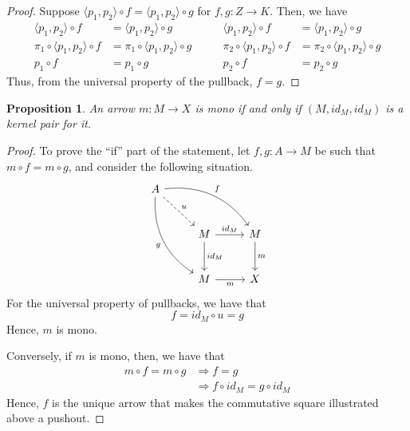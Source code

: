 \documentclass[runningheads,envcountsect]{llncs}
\theoremstyle{plain}
\newtheorem{prop}[theorem]{Proposition}
\theoremstyle{definition}
\begin{document}
\begin{proof}
	Suppose $\langle p_1, p_2 \rangle \circ f = \langle p_1, p_2 \rangle \circ g$ for $f, g: Z \to K$. Then, we have
	\[
		\begin{split}
			\langle p_1, p_2 \rangle \circ f &=  \langle p_1, p_2 \rangle \circ g \\
			\pi_1 \circ \langle p_1, p_2 \rangle \circ f &=  \pi_1 \circ \langle p_1, p_2 \rangle \circ g \\
			p_1 \circ f &= p_1 \circ g
		\end{split}
		\qquad
		\begin{split}
			\langle p_1, p_2 \rangle \circ f &=  \langle p_1, p_2 \rangle \circ g \\
			\pi_2 \circ \langle p_1, p_2 \rangle \circ f &=  \pi_2 \circ \langle p_1, p_2 \rangle \circ g \\
			p_2 \circ f &= p_2 \circ g
		\end{split}
	\]
	Thus, from the universal property of the pullback, $f = g$.
\end{proof}

\begin{prop}\label{prop:kermono}
	An arrow $m\colon M\to X$ is mono if and only if $(M, id_M, id_M)$ is a kernel pair for it.
\end{prop}

\begin{proof}
    To prove the ``if'' part of the statement, let $f, g: A \to M$ be such that $m\circ f = m\circ g$, and consider the following situation.
    \[
        \begin{tikzcd}[row sep=26, column sep = 26]
        A \arrow[drr, bend left=30, "f"] \arrow[ddr, bend right=30,"g" swap] \arrow[dr, dashed, "u"] & & \\
        & M  \arrow[d, "{id_M}"] \arrow[r, "{id_M}"] & M \arrow[d, "m"] \\
        & M  \arrow[r, "m" swap] & X
        \end{tikzcd}
    \]
    For the universal property of pullbacks, we have that $$f  =  id_M \circ u =  g$$
    Hence, $m$ is mono.

    Conversely, if $m$ is mono, then, we have that
    \begin{align*}
        m \circ f = m \circ g   &\Rightarrow    f = g \\
                                &\Rightarrow    f \circ id_M = g\circ id_M
    \end{align*}
    Hence, $f$ is the unique arrow that makes the commutative square illustrated above a pushout.
\end{proof}
\end{document}
